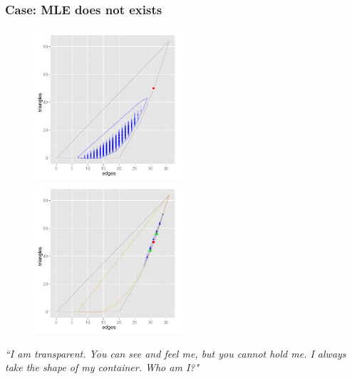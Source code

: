 \documentclass[ 10pt]{beamer}
\newcommand{\yobs}{y_{\text{obs}}}
\begin{document}
\frame
{
\frametitle{Case: MLE does not exists}  
\begin{figure}[h]
\centering
\includegraphics[height=2.2in]{MCsample-boundary}
\includegraphics[height=2.2in]{MCsample-77face}
\label{F:MCsample-MLE nonexistent}
\end{figure}
\pause
\emph{``I am transparent. You can see and feel me, but you cannot hold me. I always take the shape of my container. Who am I?"}
}
%
%
%
\end{document}
